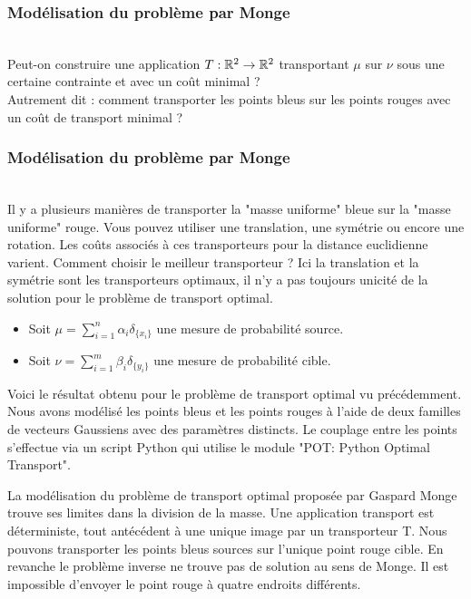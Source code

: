 \documentclass{beamer}
\theoremstyle{definition}
\begin{document}
\begin{frame}
	\frametitle{Modélisation du problème par Monge}\hfill\\[-0.8cm]
Peut-on construire une application $T : \mathbb{R}^2 \to \mathbb{R}^2$ transportant $\mu$ sur $\nu$ sous une certaine contrainte et avec un coût minimal ?\\ Autrement dit : comment transporter les points bleus sur les points
rouges avec un coût de transport minimal ? 


	
\end{frame}

\begin{frame}
	\frametitle{Modélisation du problème par Monge}\hfill\\[-0.8cm]

	Il y a plusieurs manières de transporter la "masse uniforme" bleue sur la "masse uniforme" rouge. Vous pouvez utiliser une translation, une symétrie ou encore une rotation. Les coûts associés à ces transporteurs pour la distance euclidienne varient. Comment choisir le meilleur transporteur ? 
	Ici la translation et la symétrie sont les transporteurs optimaux, il n'y a pas toujours unicité de la solution pour le problème de transport optimal. 
	
	
\end{frame}


\begin{frame}

	\begin{itemize}
		\item Soit $\displaystyle\mu = \sum_{i=1}^{n}\alpha_i\delta_{\{x_i\}}$ une mesure de probabilité source. 
		\item Soit $\displaystyle \nu = \sum_{i=1}^{m}\beta_i\delta_{\{y_i\}}$ une mesure de probabilité cible.
	\end{itemize}
	
\end{frame}

\begin{frame}
	
Voici le résultat obtenu pour le problème de transport optimal vu précédemment. Nous avons modélisé les points bleus et les points rouges à l'aide de deux familles de vecteurs Gaussiens avec des paramètres distincts. Le couplage entre les points s'effectue via un script Python qui utilise le module "POT: Python Optimal Transport". 


\end{frame}


\begin{frame}

La modélisation du problème de transport optimal proposée par Gaspard Monge trouve ses limites dans la division de la masse. Une application transport est déterministe, tout antécédent à une unique image par un transporteur T. Nous pouvons transporter les points bleus sources sur l'unique point rouge cible. En revanche le problème inverse ne trouve pas de solution au sens de Monge. Il est impossible d'envoyer le point rouge à quatre endroits différents.  
	
	
\end{frame}
\end{document}
